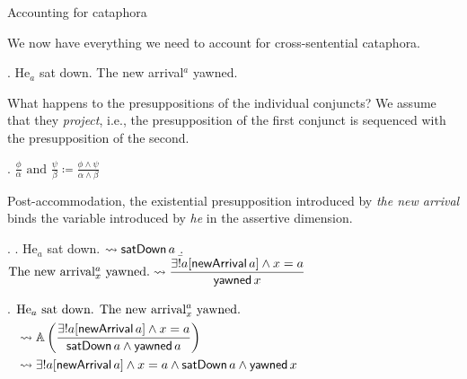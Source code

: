 \documentclass{beamer}
\begin{document}
\begin{frame}[allowframebreaks]{Accounting for cataphora}

  We now have everything we need to account for cross-sentential cataphora.

  \ex. He\(_{a}\) sat down. The new arrival\(^{a}\) yawned.

 What happens to the presuppositions of the individual conjuncts? We assume that they \textit{project}, i.e., the presupposition of the first conjunct is sequenced with the presupposition of the second.

 \ex. \(\displaystyle\frac{\phi}{\alpha}\text{ and }\frac{\psi}{\beta} \coloneq \frac{\phi \wedge \psi}{\alpha \wedge \beta}\)

 \framebreak

 Post-accommodation, the existential presupposition introduced by \textit{the new arrival} binds the variable introduced by \textit{he} in the assertive dimension.

 \exi.
 \a. He\(_{a}\) sat down. $\rightsquigarrow \textsf{satDown}\,a$
 \b. $\text{The new arrival\(^{a}_{x}\) yawned.}\rightsquigarrow\displaystyle\frac{\exists !a[\textsf{newArrival}\,a] \wedge x = a}{\textsf{yawned}\,x}$

\ex. $\begin{aligned}[t]
  &\text{He\(_{a}\) sat down. The new arrival\(^{a}_{x}\) yawned.}\\ &\rightsquigarrow\mathbb{A}\left(\displaystyle\frac{\exists ! a[\textsf{newArrival}\,a] \wedge x = a}{\textsf{satDown}\,a \wedge \textsf{yawned}\,a}\right)\\
&\rightsquigarrow \exists ! a[\textsf{newArrival}\,a] \wedge x =a \wedge \textsf{satDown}\,a \wedge \textsf{yawned}\,x\end{aligned}$

\end{frame}
\end{document}
